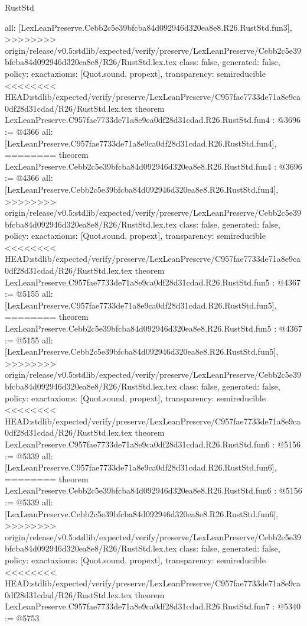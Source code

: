 \begin{lexlean}{RustStd}
\begin{coremodule}
{\begin{coremodule}
{{{{{{{  all: [LexLeanPreserve.Cebb2c5e39bfcba84d092946d320ea8e8.R26.RustStd.fun3],
>>>>>>>> origin/release/v0.5:stdlib/expected/verify/preserve/LexLeanPreserve/Cebb2c5e39bfcba84d092946d320ea8e8/R26/RustStd.lex.tex
  class: false,
  generated: false,
  policy: exact{axioms: [Quot.sound, propext]},
  transparency: semireducible
}
<<<<<<<< HEAD:stdlib/expected/verify/preserve/LexLeanPreserve/C957fae7733de71a8e9ca0df28d31cdad/R26/RustStd.lex.tex
theorem LexLeanPreserve.C957fae7733de71a8e9ca0df28d31cdad.R26.RustStd.fun4 : @3696 := @4366 {
  all: [LexLeanPreserve.C957fae7733de71a8e9ca0df28d31cdad.R26.RustStd.fun4],
========
theorem LexLeanPreserve.Cebb2c5e39bfcba84d092946d320ea8e8.R26.RustStd.fun4 : @3696 := @4366 {
  all: [LexLeanPreserve.Cebb2c5e39bfcba84d092946d320ea8e8.R26.RustStd.fun4],
>>>>>>>> origin/release/v0.5:stdlib/expected/verify/preserve/LexLeanPreserve/Cebb2c5e39bfcba84d092946d320ea8e8/R26/RustStd.lex.tex
  class: false,
  generated: false,
  policy: exact{axioms: [Quot.sound, propext]},
  transparency: semireducible
}
<<<<<<<< HEAD:stdlib/expected/verify/preserve/LexLeanPreserve/C957fae7733de71a8e9ca0df28d31cdad/R26/RustStd.lex.tex
theorem LexLeanPreserve.C957fae7733de71a8e9ca0df28d31cdad.R26.RustStd.fun5 : @4367 := @5155 {
  all: [LexLeanPreserve.C957fae7733de71a8e9ca0df28d31cdad.R26.RustStd.fun5],
========
theorem LexLeanPreserve.Cebb2c5e39bfcba84d092946d320ea8e8.R26.RustStd.fun5 : @4367 := @5155 {
  all: [LexLeanPreserve.Cebb2c5e39bfcba84d092946d320ea8e8.R26.RustStd.fun5],
>>>>>>>> origin/release/v0.5:stdlib/expected/verify/preserve/LexLeanPreserve/Cebb2c5e39bfcba84d092946d320ea8e8/R26/RustStd.lex.tex
  class: false,
  generated: false,
  policy: exact{axioms: [Quot.sound, propext]},
  transparency: semireducible
}
<<<<<<<< HEAD:stdlib/expected/verify/preserve/LexLeanPreserve/C957fae7733de71a8e9ca0df28d31cdad/R26/RustStd.lex.tex
theorem LexLeanPreserve.C957fae7733de71a8e9ca0df28d31cdad.R26.RustStd.fun6 : @5156 := @5339 {
  all: [LexLeanPreserve.C957fae7733de71a8e9ca0df28d31cdad.R26.RustStd.fun6],
========
theorem LexLeanPreserve.Cebb2c5e39bfcba84d092946d320ea8e8.R26.RustStd.fun6 : @5156 := @5339 {
  all: [LexLeanPreserve.Cebb2c5e39bfcba84d092946d320ea8e8.R26.RustStd.fun6],
>>>>>>>> origin/release/v0.5:stdlib/expected/verify/preserve/LexLeanPreserve/Cebb2c5e39bfcba84d092946d320ea8e8/R26/RustStd.lex.tex
  class: false,
  generated: false,
  policy: exact{axioms: [Quot.sound, propext]},
  transparency: semireducible
}
<<<<<<<< HEAD:stdlib/expected/verify/preserve/LexLeanPreserve/C957fae7733de71a8e9ca0df28d31cdad/R26/RustStd.lex.tex
theorem LexLeanPreserve.C957fae7733de71a8e9ca0df28d31cdad.R26.RustStd.fun7 : @5340 := @5753 {
}}}}}}}}}}
\end{coremodule}}
\end{coremodule}
\end{lexlean}
